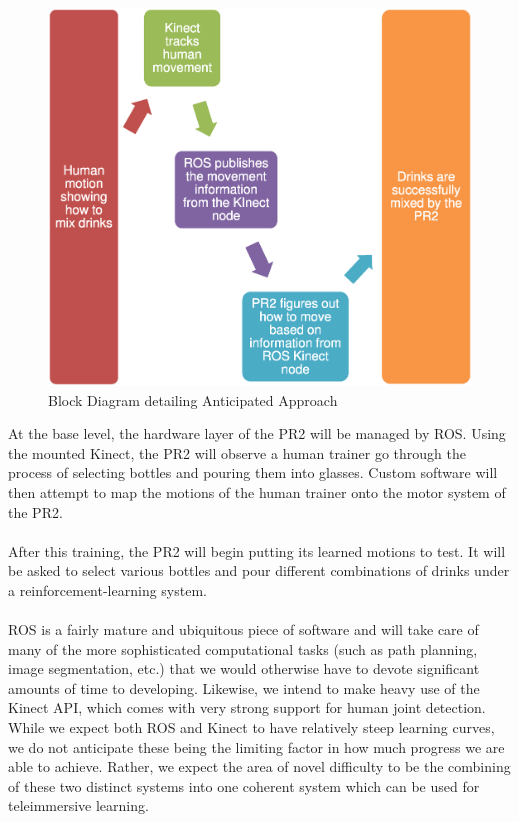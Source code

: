 \documentclass{sig-alternate}
\begin{document}
\begin{figure}[htb!]
	\begin{center}
		\includegraphics[width=0.9\linewidth]{flowchart}
	\end{center}
	\vspace{-12pt}
	\caption{Block Diagram detailing Anticipated Approach}
	\label{fig:some_graph}
\end{figure}

At the base level, the hardware layer of the PR2 will be managed by ROS.
Using the mounted Kinect, the PR2 will observe a human trainer go
through the process of selecting bottles and pouring them into glasses. Custom 
software will then attempt to map the motions of the human trainer onto the 
motor system of the PR2.
\\
\\After this training, the PR2 will begin putting its learned motions to test.
It will be asked to select various bottles and  pour different combinations of
drinks under a reinforcement-learning system.
\\
\\ROS is a fairly mature and ubiquitous piece of software and will take care of
many of the more sophisticated computational tasks (such as path planning, 
image segmentation, etc.) that we would otherwise have to devote significant 
amounts of time to developing.  
Likewise, we intend to make heavy use of the Kinect API, which comes with very
strong support for human joint detection.
While we expect both ROS and Kinect to have relatively steep learning curves,
we do not anticipate these being the limiting factor in how much progress we
are able to achieve. 
Rather, we expect the area of novel difficulty to be the combining of these
two distinct systems into one coherent system which can be used for
teleimmersive learning.
\end{document}

